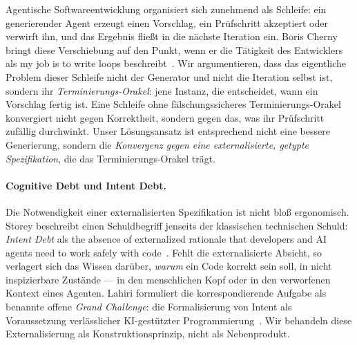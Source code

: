 \documentclass[11pt,a4paper]{article}
\theoremstyle{definition}
\theoremstyle{remark}
\begin{document}
Agentische Softwareentwicklung organisiert sich zunehmend als Schleife: ein
generierender Agent erzeugt einen Vorschlag, ein Prüfschritt akzeptiert oder verwirft ihn,
und das Ergebnis fließt in die nächste Iteration ein. Boris Cherny bringt diese
Verschiebung auf den Punkt, wenn er die Tätigkeit des Entwicklers als \glqq my job is to
write loops\grqq{} beschreibt~\cite{cherny2026}. Wir argumentieren, dass das eigentliche
Problem dieser Schleife nicht der Generator und nicht die Iteration selbst ist, sondern ihr
\emph{Terminierungs-Orakel}: jene Instanz, die entscheidet, wann ein Vorschlag \glqq fertig\grqq{}
ist. Eine Schleife ohne fälschungssicheres Terminierungs-Orakel konvergiert nicht gegen
Korrektheit, sondern gegen das, was ihr Prüfschritt zufällig durchwinkt. Unser Lösungsansatz
ist entsprechend nicht eine bessere Generierung, sondern die \emph{Konvergenz gegen eine
externalisierte, getypte Spezifikation}, die das Terminierungs-Orakel trägt.

\paragraph{Cognitive Debt und Intent Debt.}
Die Notwendigkeit einer externalisierten Spezifikation ist nicht bloß ergonomisch. Storey
beschreibt einen Schuldbegriff jenseits der klassischen technischen Schuld:
\emph{Intent Debt} als \glqq the absence of externalized rationale that developers and AI
agents need to work safely with code\grqq{}~\cite{storey2026}. Fehlt die externalisierte
Absicht, so verlagert sich das Wissen darüber, \emph{warum} ein Code korrekt sein soll, in
nicht inspizierbare Zustände --- in den menschlichen Kopf oder in den verworfenen Kontext
eines Agenten. Lahiri formuliert die korrespondierende Aufgabe als benannte offene
\emph{Grand Challenge}: die Formalisierung von Intent als Voraussetzung verlässlicher
KI-gestützter Programmierung~\cite{lahiri2026}. Wir behandeln diese Externalisierung als
Konstruktionsprinzip, nicht als Nebenprodukt.
\end{document}
